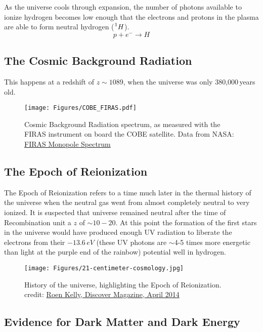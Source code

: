 As the universe cools through expansion, the number of photons available to ionize hydrogen becomes low enough that the electrons and protons in the plasma are able to form neutral hydrogen ($\prescript{1}{}H$). 
\begin{equation}
p + e^- \longrightarrow H
\end{equation}

\subsection{The Cosmic Background Radiation}
This happens at a redshift of $z \sim 1089$, when the universe was only 380,000\,years old.

\begin{figure}[h]
\centering
\texttt{[image: Figures/COBE\_FIRAS.pdf]}
\caption{Cosmic Background Radiation spectrum, as measured with the FIRAS instrument on board the COBE satellite. Data from NASA: \href{http://lambda.gsfc.nasa.gov/product/cobe/firas_prod_table.cfm}{FIRAS Monopole Spectrum}}
\label{fig:FIRAS}
\end{figure}

\subsection{The Epoch of Reionization}
The Epoch of Reionization refers to a time much later in the thermal history of the universe when the neutral gas went from almost completely neutral to very ionized. It is suspected that
universe remained neutral after the time of Recombination unit a $z$ of $\sim 10-20$. At this point the formation of the first stars in the universe would have produced enough UV radiation to liberate the electrons from their $-13.6\,eV$ (these UV photons are $\sim$4-5 times more energetic than light at the purple end of the rainbow) potential well in hydrogen. 
\begin{figure}[h]
\centering
\texttt{[image: Figures/21-centimeter-cosmology.jpg]}
\caption{History of the universe, highlighting the Epoch of Reionization.
credit: \href{http://discovermagazine.com/2014/april/12-first-light}{Roen Kelly, Discover Magazine, April 2014}}
\label{fig:EoR}
\end{figure}

\subsection{Evidence for Dark Matter and Dark Energy}

